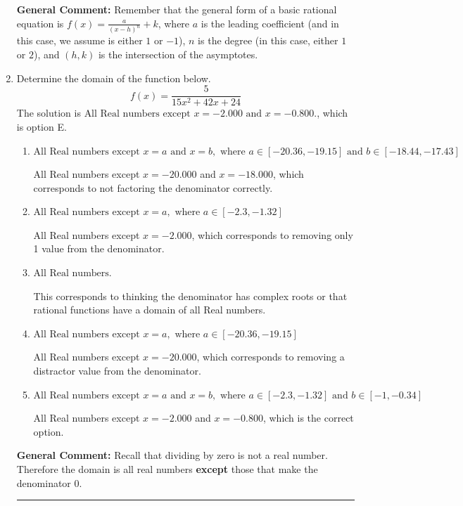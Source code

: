 \documentclass{extbook}[14pt]
\newcommand{\litem}[1]{\item #1

\rule{\textwidth}{0.4pt}}
\begin{document}
\begin{enumerate}
{\textbf{General Comment:} Remember that the general form of a basic rational equation is $ f(x) = \frac{a}{(x-h)^n} + k$, where $a$ is the leading coefficient (and in this case, we assume is either $1$ or $-1$), $n$ is the degree (in this case, either $1$ or $2$), and $(h, k)$ is the intersection of the asymptotes.
}
\litem{
Determine the domain of the function below.
\[ f(x) = \frac{5}{15x^{2} +42 x + 24} \]The solution is \( \text{All Real numbers except } x = -2.000 \text{ and } x = -0.800. \), which is option E.\begin{enumerate}[label=\Alph*.]
\item \( \text{All Real numbers except } x = a \text{ and } x = b, \text{ where } a \in [-20.36, -19.15] \text{ and } b \in [-18.44, -17.43] \)

All Real numbers except $x = -20.000$ and $x = -18.000$, which corresponds to not factoring the denominator correctly.
\item \( \text{All Real numbers except } x = a, \text{ where } a \in [-2.3, -1.32] \)

All Real numbers except $x = -2.000$, which corresponds to removing only 1 value from the denominator.
\item \( \text{All Real numbers.} \)

This corresponds to thinking the denominator has complex roots or that rational functions have a domain of all Real numbers.
\item \( \text{All Real numbers except } x = a, \text{ where } a \in [-20.36, -19.15] \)

All Real numbers except $x = -20.000$, which corresponds to removing a distractor value from the denominator.
\item \( \text{All Real numbers except } x = a \text{ and } x = b, \text{ where } a \in [-2.3, -1.32] \text{ and } b \in [-1, -0.34] \)

All Real numbers except $x = -2.000$ and $x = -0.800$, which is the correct option.
\end{enumerate}

\textbf{General Comment:} Recall that dividing by zero is not a real number. Therefore the domain is all real numbers \textbf{except} those that make the denominator 0.
}
\end{enumerate}
\end{document}
